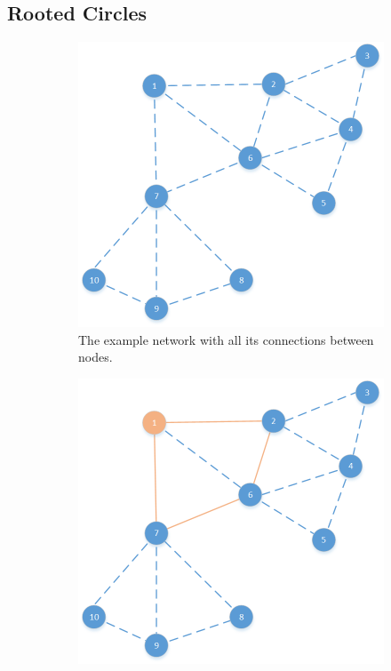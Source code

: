 \subsection{Rooted Circles}
\begin{figure}[htbp]
	\centering
	\begin{subfigure}[t]{0.4\textwidth}
		\centering
    		\includegraphics[scale=0.6]{content/images/Schedule/Network}
   	 	\caption{The example network with all its connections between nodes.}
    	\label{fig:network}
    \end{subfigure}
    \quad
    \quad
    \begin{subfigure}[t]{0.4\textwidth}
		\centering         
        \includegraphics[scale=0.6]{content/images/Schedule/RootedCircle}

\end{subfigure}
\end{figure}
